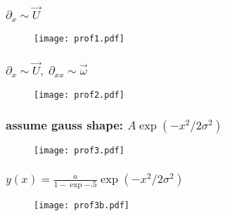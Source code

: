 \begin{frame}
 \frametitle{$ \partial_x \sim \vec{U}$}
\begin{figure}
	\centering
	\texttt{[image: prof1.pdf]}
\end{figure}
\end{frame}
\begin{frame}
 \frametitle{$ \partial_x \sim \vec{U}, \; \partial_{xx} \sim \vec{\omega}$}
\begin{figure}
	\centering
	\texttt{[image: prof2.pdf]}
\end{figure}
\end{frame}

\begin{frame}
\frametitle{assume gauss shape:  $A \exp{\left(- x^2/2\sigma^2\right)}$}
 \begin{figure}
\centering
\texttt{[image: prof3.pdf]}
\end{figure}
\end{frame}

\begin{frame}
 \frametitle{$ y(x)= \frac{a}{1-\exp{-.5}}  \exp{\left(- x^2/2\sigma^2\right)}$} 
\begin{figure}
\centering
\texttt{[image: prof3b.pdf]}
\end{figure}
\end{frame}

